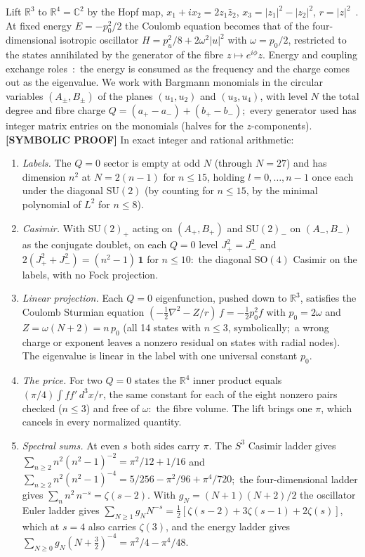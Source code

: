 \documentclass[twocolumn,pra,amsmath,amssymb,superscriptaddress]{revtex4-2}
\begin{document}
Lift $\mathbb{R}^3$ to $\mathbb{R}^4 = \mathbb{C}^2$ by the Hopf map,
$x_1 + i x_2 = 2 z_1 \bar z_2$, $x_3 = |z_1|^2 - |z_2|^2$,
$r = |z|^2$~\cite{kustaanheimo1965}.  At fixed energy
$E = -p_0^2/2$ the Coulomb equation becomes that of the
four-dimensional isotropic oscillator $H = p_u^2/8 + 2\omega^2|u|^2$
with $\omega = p_0/2$, restricted to the states annihilated by the
generator of the fibre $z \mapsto e^{i\phi}z$.  Energy and coupling
exchange roles~\cite{hietarinta1984}:\ the energy is consumed as the
frequency and the charge comes out as the eigenvalue.  We work with
Bargmann monomials in the circular variables $(A_\pm, B_\pm)$ of the
planes $(u_1, u_2)$ and $(u_3, u_4)$, with level $N$ the total degree
and fibre charge $Q = (a_+ - a_-) + (b_+ - b_-)$;\ every generator used
has integer matrix entries on the monomials (halves for the
$z$-components).  \textbf{[SYMBOLIC PROOF]} In exact integer and
rational arithmetic:
\begin{enumerate}\setlength{\itemsep}{2pt}
\item \emph{Labels.}  The $Q = 0$ sector is empty at odd $N$ (through
  $N = 27$) and has dimension $n^2$ at $N = 2(n-1)$ for $n \le 15$,
  holding $l = 0, \ldots, n-1$ once each under the diagonal
  $\mathrm{SU}(2)$ (by counting for $n \le 15$, by the minimal
  polynomial of $L^2$ for $n \le 8$).
\item \emph{Casimir.}  With $\mathrm{SU}(2)_+$ acting on $(A_+, B_+)$
  and $\mathrm{SU}(2)_-$ on $(A_-, B_-)$ as the conjugate doublet, on
  each $Q = 0$ level $J_+^2 = J_-^2$ and
  $2(J_+^2 + J_-^2) = (n^2 - 1)\,\mathbf{1}$ for $n \le 10$:\ the
  diagonal $\mathrm{SO}(4)$ Casimir on the labels, with no Fock
  projection.
\item \emph{Linear projection.}  Each $Q = 0$ eigenfunction, pushed down
  to $\mathbb{R}^3$, satisfies the Coulomb Sturmian equation
  $(-\tfrac12\nabla^2 - Z/r)\,f = -\tfrac12 p_0^2 f$ with $p_0 = 2\omega$
  and $Z = \omega(N + 2) = n\,p_0$ (all 14 states with $n \le 3$,
  symbolically;\ a wrong charge or exponent leaves a nonzero residual
  on states with radial nodes).  The eigenvalue is linear in the label
  with one universal constant $p_0$.
\item \emph{The price.}  For two $Q = 0$ states the $\mathbb{R}^4$ inner
  product equals $(\pi/4)\int f f'\,d^3x/r$, the same constant for each
  of the eight nonzero pairs checked ($n \le 3$) and free of $\omega$:\
  the fibre volume.  The lift brings one $\pi$, which cancels in every
  normalized quantity.
\item \emph{Spectral sums.}  At even $s$ both sides carry $\pi$.  The
  $S^3$ Casimir ladder gives $\sum_{n \ge 2} n^2 (n^2-1)^{-2} =
  \pi^2/12 + 1/16$ and $\sum_{n \ge 2} n^2 (n^2-1)^{-4} = 5/256 -
  \pi^2/96 + \pi^4/720$;\ the four-dimensional ladder gives
  $\sum_n n^2\, n^{-s} = \zeta(s-2)$.  With $g_N = (N+1)(N+2)/2$ the
  oscillator Euler ladder gives $\sum_{N \ge 1} g_N N^{-s} =
  \tfrac12[\zeta(s-2) + 3\zeta(s-1) + 2\zeta(s)]$, which at $s = 4$
  also carries $\zeta(3)$, and the energy ladder gives
  $\sum_{N \ge 0} g_N (N + \tfrac32)^{-4} = \pi^2/4 - \pi^4/48$.
\end{enumerate}
\end{document}
